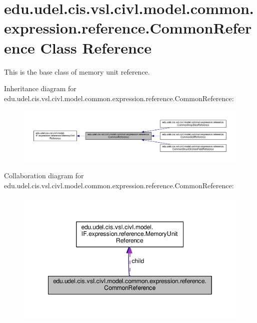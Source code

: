 \hypertarget{classedu_1_1udel_1_1cis_1_1vsl_1_1civl_1_1model_1_1common_1_1expression_1_1reference_1_1CommonReference}{}\section{edu.\+udel.\+cis.\+vsl.\+civl.\+model.\+common.\+expression.\+reference.\+Common\+Reference Class Reference}
\label{classedu_1_1udel_1_1cis_1_1vsl_1_1civl_1_1model_1_1common_1_1expression_1_1reference_1_1CommonReference}


This is the base class of memory unit reference.  




Inheritance diagram for edu.\+udel.\+cis.\+vsl.\+civl.\+model.\+common.\+expression.\+reference.\+Common\+Reference\+:
\nopagebreak
\begin{figure}[H]
\begin{center}
\leavevmode
\includegraphics[width=350pt]{classedu_1_1udel_1_1cis_1_1vsl_1_1civl_1_1model_1_1common_1_1expression_1_1reference_1_1CommonReference__inherit__graph}
\end{center}
\end{figure}


Collaboration diagram for edu.\+udel.\+cis.\+vsl.\+civl.\+model.\+common.\+expression.\+reference.\+Common\+Reference\+:
\nopagebreak
\begin{figure}[H]
\begin{center}
\leavevmode
\includegraphics[width=349pt]{classedu_1_1udel_1_1cis_1_1vsl_1_1civl_1_1model_1_1common_1_1expression_1_1reference_1_1CommonReference__coll__graph}
\end{center}
\end{figure}

